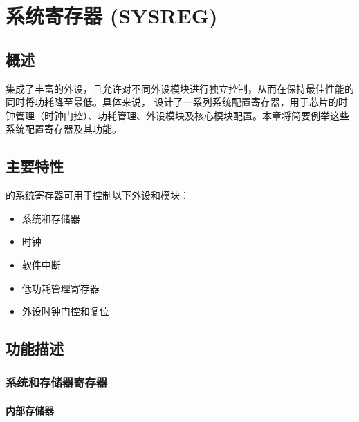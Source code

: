 \documentclass[main\_\_CN.tex]{subfiles}
\begin{document}

\ifglobal
\else
    {\let\clearpage\relax \listoftodos}
    \tableofcontents
\fi



\chapter{系统寄存器 (SYSREG)}
\label{mod:sysreg}
\hypertarget{sysreg}{}

\section{概述}

\chipname{} 集成了丰富的外设，且允许对不同外设模块进行独立控制，从而在保持最佳性能的同时将功耗降至最低。具体来说，\chipname{} 设计了一系列系统配置寄存器，用于芯片的时钟管理（时钟门控）、功耗管理、外设模块及核心模块配置。本章将简要例举这些系统配置寄存器及其功能。

\section{主要特性}

\chipname{} 的系统寄存器可用于控制以下外设和模块：

\begin{itemize}
    \item 系统和存储器
    \item 时钟
    \item 软件中断
    \item 低功耗管理寄存器
    \item 外设时钟门控和复位
\end{itemize}


\section{功能描述}

\subsection{系统和存储器寄存器}

\subsubsection{内部存储器}
\end{document}

